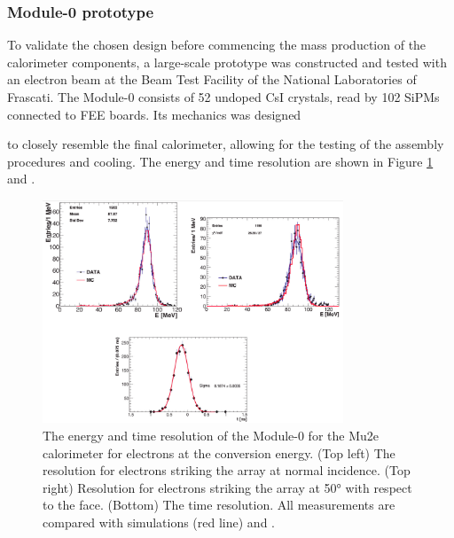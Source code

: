 \subsubsection{Module-0 prototype}
To validate the chosen design before commencing the mass production of 
the calorimeter components, a large-scale prototype was constructed and 
tested with an electron beam at the Beam Test Facility of the National 
Laboratories of Frascati. The Module-0 consists of 52 undoped CsI crystals, 
read by 102 SiPMs connected to FEE boards. Its mechanics was designed

to closely resemble the final calorimeter, allowing for the testing 
of the assembly procedures and cooling.
The energy and time resolution are
shown in Figure \ref{fig:calores} \cite{bobbb} and \cite{calo95}.
\begin{figure}[!h]
    \centering
    \includegraphics[width =0.8\textwidth]{figures/png/Screenshot_20240330_105520.png}
    \caption[The energy and time resolution of the calorimeter Module-0.]{The 
    energy and time resolution of the Module-0 for the Mu2e 
    calorimeter for electrons at the conversion energy. (Top left) The resolution 
    for electrons striking the array at normal incidence. (Top right) 
    Resolution for electrons striking the array at 50° with respect to the 
    face. (Bottom) The time resolution. All measurements are compared with 
    simulations (red line) \cite{bobbb} and \cite{calo95}.}
    \label{fig:calores}
\end{figure}

